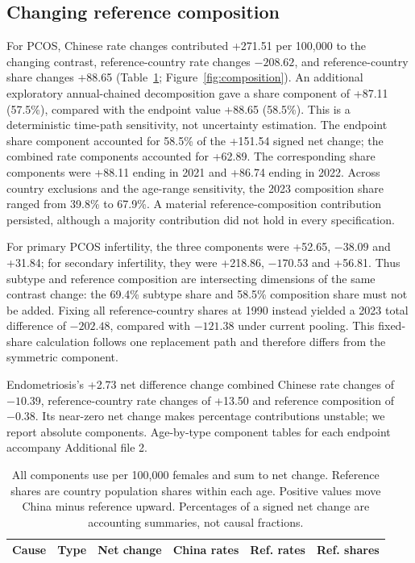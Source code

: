 \documentclass[11pt,a4paper]{article}
\begin{document}
\subsection{Changing reference composition}
For PCOS, Chinese rate changes contributed +271.51 per 100,000 to the changing contrast, reference-country rate changes $-208.62$, and reference-country share changes +88.65 (Table~\ref{tab:composition}; Figure~\ref{fig:composition}). An additional exploratory annual-chained decomposition gave a share component of +87.11 (57.5\%), compared with the endpoint value +88.65 (58.5\%). This is a deterministic time-path sensitivity, not uncertainty estimation. The endpoint share component accounted for 58.5\% of the +151.54 signed net change; the combined rate components accounted for +62.89. The corresponding share components were +88.11 ending in 2021 and +86.74 ending in 2022. Across country exclusions and the age-range sensitivity, the 2023 composition share ranged from 39.8\% to 67.9\%. A material reference-composition contribution persisted, although a majority contribution did not hold in every specification.

For primary PCOS infertility, the three components were +52.65, $-38.09$ and +31.84; for secondary infertility, they were +218.86, $-170.53$ and +56.81. Thus subtype and reference composition are intersecting dimensions of the same contrast change: the 69.4\% subtype share and 58.5\% composition share must not be added. Fixing all reference-country shares at 1990 instead yielded a 2023 total difference of $-202.48$, compared with $-121.38$ under current pooling. This fixed-share calculation follows one replacement path and therefore differs from the symmetric component.

Endometriosis's +2.73 net difference change combined Chinese rate changes of $-10.39$, reference-country rate changes of +13.50 and reference composition of $-0.38$. Its near-zero net change makes percentage contributions unstable; we report absolute components. Age-by-type component tables for each endpoint accompany Additional file 2.

\begin{table}[htbp]\centering\small{}
\caption{Symmetric decomposition of changes in standardized differences, 1990--2023.}\label{tab:composition}
\setlength{\tabcolsep}{3pt}
\begin{tabular}{llrrrr}\toprule
Cause & Type & Net change & China rates & Ref. rates & Ref. shares\\\midrule
\end{tabular}
\caption*{All components use per 100,000 females and sum to net change. Reference shares are country population shares within each age. Positive values move China minus reference upward. Percentages of a signed net change are accounting summaries, not causal fractions.}
\end{table}
\end{document}
